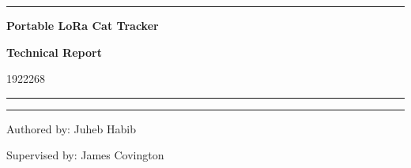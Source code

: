 \begin{titlepage}
    \begin{center}
        \vspace*{1cm}
            
        
        \textcolor{titleblue}{\rule{\linewidth}{1mm}}\par

        \vspace{0.5cm}

        \textbf{\Huge Portable LoRa Cat Tracker}
            
        \vspace{0.5cm}
        
        \textbf{\huge Technical Report}

        \vspace{0.5cm}

        {\huge 1922268}
        
        \textcolor{titleblue}{\rule{\linewidth}{1mm}}\par
        
        \vfill

        
        \begin{flushleft}        
        \textcolor{titleblue}{\rule{0.6\linewidth}{2pt}}\par
        {\raggedleft\LARGE Authored by: Juheb Habib}
        
        \vspace{0.2cm}
        {\raggedleft\LARGE Supervised by: James Covington}
        \end{flushleft}
              
                       
        \vspace{0.8cm}
            
    \end{center}
\end{titlepage}